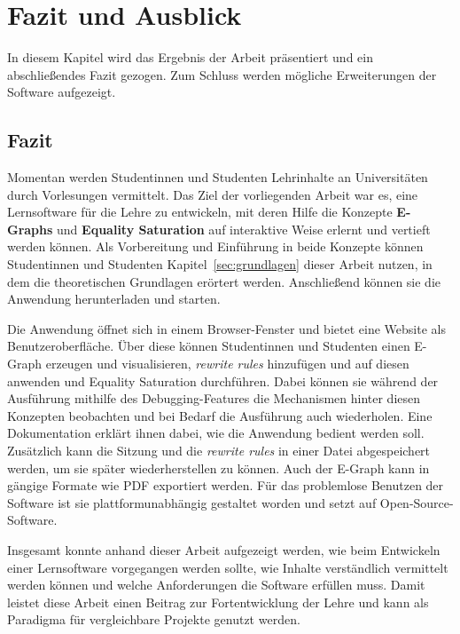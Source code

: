 \section{Fazit und Ausblick}\label{sec:fazit}

In diesem Kapitel wird das Ergebnis der Arbeit präsentiert und ein abschließendes Fazit gezogen. Zum Schluss werden mögliche Erweiterungen der Software aufgezeigt. 

\subsection{Fazit}

Momentan werden Studentinnen und Studenten Lehrinhalte an Universitäten durch Vorlesungen vermittelt. Das Ziel der vorliegenden Arbeit war es, eine Lernsoftware für die Lehre
zu entwickeln, mit deren Hilfe die Konzepte \textbf{E-Graphs} und \textbf{Equality Saturation} auf interaktive Weise erlernt und vertieft werden können.
Als Vorbereitung und Einführung in beide Konzepte können Studentinnen und Studenten Kapitel~\ref{sec:grundlagen} dieser Arbeit nutzen, in dem die theoretischen Grundlagen erörtert werden.
Anschließend können sie die Anwendung herunterladen und starten. 

Die Anwendung öffnet sich in einem Browser-Fenster und bietet eine Website als Benutzeroberfläche. Über diese können Studentinnen und Studenten einen E-Graph erzeugen und visualisieren, 
\textit{rewrite rules} hinzufügen und auf diesen anwenden und Equality Saturation durchführen. 
Dabei können sie während der Ausführung mithilfe des Debugging-Features die Mechanismen hinter diesen Konzepten beobachten und bei Bedarf die Ausführung auch wiederholen.
Eine Dokumentation erklärt ihnen dabei, wie die Anwendung bedient werden soll. Zusätzlich kann die Sitzung und die \textit{rewrite rules} in einer Datei abgespeichert werden, um
sie später wiederherstellen zu können. Auch der E-Graph kann in gängige Formate wie PDF exportiert werden.
Für das problemlose Benutzen der Software ist sie plattformunabhängig gestaltet worden und setzt auf Open-Source-Software.





Insgesamt konnte anhand dieser Arbeit aufgezeigt werden, wie beim Entwickeln einer Lernsoftware vorgegangen werden sollte, wie Inhalte verständlich vermittelt werden können und welche
Anforderungen die Software erfüllen muss.
Damit leistet diese Arbeit einen Beitrag zur Fortentwicklung der Lehre und kann als Paradigma für vergleichbare Projekte genutzt werden.

